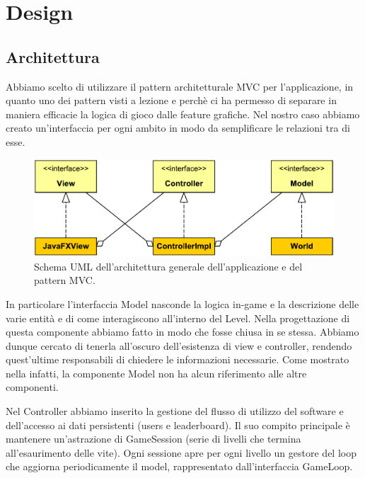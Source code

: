 \documentclass[a4paper,12pt]{report}
\begin{document}
\chapter{Design}

\section{Architettura}

Abbiamo scelto di utilizzare il pattern architetturale MVC per l'applicazione, in quanto uno dei pattern visti a lezione e perchè ci ha permesso di separare in maniera efficacie la logica di gioco dalle feature grafiche.
Nel nostro caso abbiamo creato un'interfaccia per ogni ambito in modo da semplificare le relazioni tra di esse.

\begin{figure}[H]
\includegraphics[width=\linewidth]{img/mvc}
\caption{Schema UML dell'architettura generale dell'applicazione e del pattern MVC.}
\label{img:mvc}
\end{figure}

In particolare l'interfaccia Model nasconde la logica in-game e la descrizione delle varie entità e di come interagiscono all'interno del Level.
Nella progettazione di questa componente abbiamo fatto in modo che fosse chiusa in se stessa.
Abbiamo dunque cercato di tenerla all'oscuro dell'esistenza di view e controller, rendendo quest'ultime responsabili di chiedere le informazioni necessarie.
Come mostrato nella  infatti, la componente Model non ha alcun riferimento alle altre componenti.

Nel Controller abbiamo inserito la gestione del flusso di utilizzo del software e dell'accesso ai dati persistenti (users e leaderboard).
Il suo compito principale è mantenere un'astrazione di GameSession (serie di livelli che termina all'esaurimento delle vite).
Ogni sessione apre per ogni livello un gestore del loop che aggiorna periodicamente il model, rappresentato dall'interfaccia GameLoop.
\end{document}
